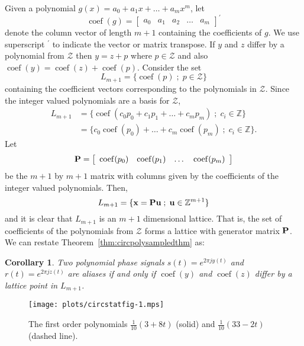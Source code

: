 \documentclass[aap,preprint]{imsart}
\newcommand{\ints}{{\mathbb Z}}
\newcommand{\term}{\emph}
\renewcommand{\mid}{\; ; \;}
\newtheorem{corollary}{Corollary}
\newcommand{\coef}{\operatorname{coef}}
\begin{document}
Given a polynomial $g(x) = a_0 + a_1x + \dots + a_m x^m$, let
\[
\coef(g) = \left[ \begin{array}{ccccc} a_0 & a_1 & a_2 & \dots & a_m \end{array} \right]^\prime
\]
denote the column vector of length $m+1$ containing the coefficients of $g$.  We use superscript $^\prime$ to indicate the vector or matrix transpose.  If $y$ and $z$ differ by a polynomial from $\mathcal{Z}$ then $y = z + p$ where $p \in \mathcal{Z}$ and also $\coef(y) = \coef(z) + \coef(p)$.
  Consider the set
\[
L_{m+1} = \{ \coef(p) \mid p \in \mathcal{Z} \}
\]
containing the coefficient vectors corresponding to the polynomials in $\mathcal{Z}$.  Since the integer valued polynomials are a basis for $\mathcal{Z}$,
\begin{align*}
L_{m+1} &= \{ \coef(c_0 p_0 + c_1p_1 + \dots + c_mp_m) \mid c_i \in \ints \} \\
&= \{ c_0 \coef(p_0) + \dots + c_m\coef(p_m) \mid c_i \in \ints \}.
\end{align*}
Let
\[
\Pbf = \left[ \begin{array}{cccc} \coef(p_0)& \coef(p_1)& \dots& \coef(p_m)  \end{array} \right]
\]
be the $m+1$ by $m+1$ matrix with columns given by the coefficients of the integer valued polynomials.  Then,
\[
L_{m+1} = \{ \xbf = \Pbf\ubf \mid \ubf \in \ints^{m+1} \}
\]
and it is clear that $L_{m+1}$ is an $m+1$ dimensional lattice.  That is, the set of coefficients of the polynomials from $\mathcal{Z}$ forms a lattice with generator matrix $\mathbf{P}$. We can restate Theorem~\ref{thm:circpolysampledthm} as:
\begin{corollary}\label{cor:circpolysampledcoef}
Two polynomial phase signals $s(t) = e^{2\pi j y(t)}$  and $r(t) = e^{2\pi j z(t)}$ are aliases if and only if $\coef(y)$ and $\coef(z)$ differ by a lattice point in $L_{m+1}$.
\end{corollary}


\begin{figure}[p]
	\centering
		\texttt{[image: plots/circstatfig-1.mps]}
		\caption{The first order polynomials $\tfrac{1}{10}(3 + 8t)$ (solid) and $\tfrac{1}{10}(33 - 2t)$ (dashed line).}
		\label{fig:circstatplot_line}
\end{figure}
\end{document}
